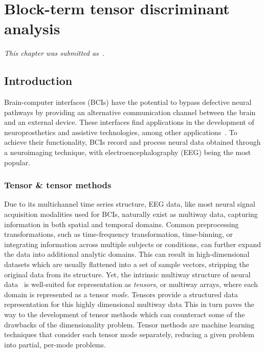 \chapter{Block-term tensor discriminant analysis}
\label{sec:bttda}

\emph{This chapter was submitted as~\textcite{VanDenKerchove2024a}}.

\section{Introduction}

Brain-computer interfaces (BCIs) have the potential to bypass
defective neural pathways by providing an alternative communication channel
between the brain and an external device.
These interfaces find applications in the development of neuroprosthetics and assistive
technologies, among other applications~\cite{Wolpaw2020}.
To achieve their functionality, BCIs record and process neural data obtained through
a neuroimaging technique, with electroencephalography (EEG) being the most popular.

\subsection{Tensor \& tensor methods}

Due to its multichannel time series structure, EEG data, like most neural
signal acquisition modalities used for BCIs, naturally exist as multiway data,
capturing information in both spatial and temporal domains.
Common preprocessing transformations, such as time-frequency transformation,
time-binning, or integrating information across multiple subjects or conditions,
can further expand the data into additional analytic domains.
This can result in high-dimensional datasets which are usually flattened into a
set of sample vectors, stripping the original data from its structure.
Yet, the intrinsic multiway structure of neural data~\cite{Erol2022} is
well-suited for representation as \emph{tensors}, or multiway arrays, where
each domain is represented as a tensor \emph{mode}.
Tensors provide a structured data representation for this highly dimensional
multiway data
This in turn paves the way to the development of tensor methods which can
counteract some of the drawbacks of the dimensionality problem.
Tensor methods are machine learning techniques that  consider each tensor mode
separately, reducing a given problem into partial, per-mode problems.

